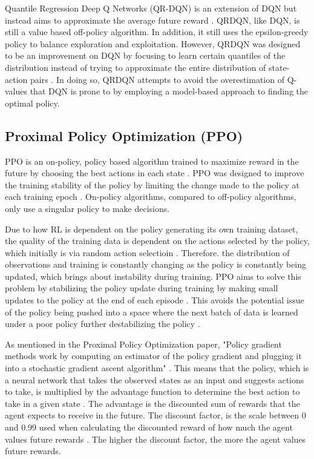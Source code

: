 Quantile Regression Deep Q Networks (QR-DQN) is an extension of DQN but instead aims to approximate the average future reward \cite{dabney2018distributional}. QRDQN, like DQN, is still a value based off-policy algorithm. In addition, it still uses the epsilon-greedy policy to balance exploration and exploitation. However, QRDQN was designed to be an improvement on DQN by focusing to learn certain quantiles of the distribution instead of trying to approximate the entire distribution of state-action pairs \cite{dabney2018distributional}. In doing so, QRDQN attempts to avoid the overestimation of Q-values that DQN is prone to by employing a model-based approach to finding the optimal policy.

\subsection{Proximal Policy Optimization (PPO)}

PPO is an on-policy, policy based algorithm trained to maximize reward in the future by choosing the best actions in each state \cite{deepcheckRL}. PPO was designed to improve the training stability of the policy by limiting the change made to the policy at each training epoch \cite{ThomasSimonini2022A2C}. On-policy algorithms, compared to off-policy algorithms, only use a singular policy to make decisions.

Due to how RL is dependent on the policy generating its own training dataset, the quality of the training data is dependent on the actions selected by the policy, which initially is via random action selectioin \cite{XanderSteenbrugge2019ppo}. Therefore. the distribution of observations and training is constantly changing as the policy is constantly being updated, which brings about instability during training. PPO aims to solve this problem by stabilizing the policy update during training by making small updates to the policy at the end of each episode \cite{XanderSteenbrugge2019intro}. This avoids the potential issue of the policy being pushed into a space where the next batch of data is learned under a poor policy further destabilizing the policy \cite{XanderSteenbrugge2019ppo}.

As mentioned in the Proximal Policy Optimization paper, "Policy gradient methods work by computing an estimator of the policy gradient and plugging it into a stochastic gradient ascent algorithm" \cite{schulman2017proximal}. This means that the policy, which is a neural network that takes the observed states as an input and suggests actions to take, is multiplied by the advantage function to determine the best action to take in a given state \cite{schulman2017proximal}. The advantage is the discounted sum of rewards that the agent expects to receive in the future. The discount factor, is the scale between 0 and 0.99 used when calculating the discounted reward of how much the agent values future rewards \cite{XanderSteenbrugge2019ppo}. The higher the discount factor, the more the agent values future rewards. 

